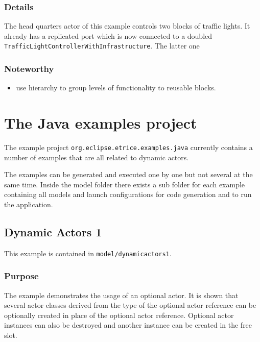 \subsubsection{Details}

The head quarters actor of this example controls two blocks of traffic
lights. It already has a replicated port which is now connected
to a doubled \texttt{TrafficLightControllerWithInfrastructure}.
The latter one 

\subsubsection{Noteworthy}

\begin{itemize}
\item use hierarchy to group levels of functionality to reusable blocks.
\end{itemize}

\section{The Java examples project}

The example project \texttt{org.eclipse.etrice.examples.java} currently contains
a number of examples that are all related to dynamic actors.

The examples can be generated and executed one by one but not several at the same
time. Inside the model folder there exists a sub folder for each example
containing all models and launch configurations for code generation and to
run the application.

\subsection{Dynamic Actors 1}

This example is contained in \texttt{model/dynamicactors1}.

\subsubsection{Purpose}

The example demonstrates the usage of an optional actor. It is shown that several actor classes
derived from the type of the optional actor reference can be optionally created in place
of the optional actor reference. Optional actor instances can also be destroyed
and another instance can be created in the free slot.

